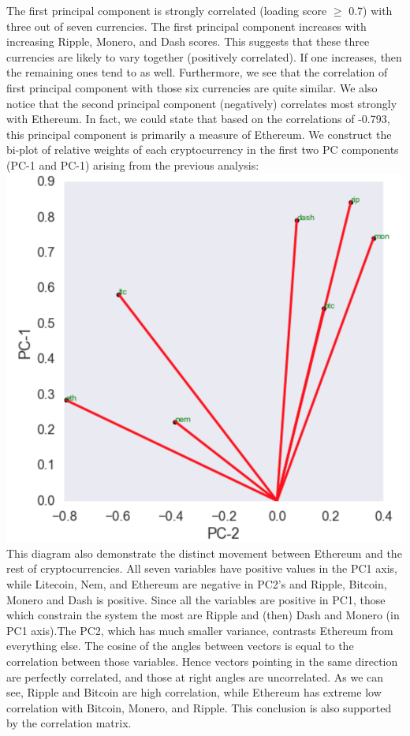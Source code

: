 \documentclass[12pt,twoside]{article}
\begin{document}
\bigbreak
The first principal component is strongly correlated (loading score $\geq$ 0.7) with three out of seven currencies. The first principal component increases with increasing Ripple, Monero, and Dash scores. This suggests that these three currencies are likely to vary together (positively correlated). If one increases, then the remaining ones tend to as well. Furthermore, we see that the correlation of first principal component with those six currencies are quite similar. \newline
We also notice that the second principal component (negatively) correlates most strongly with Ethereum. In fact, we could state that based on the correlations of -0.793, this principal component is primarily a measure of Ethereum.
\bigbreak
We construct the bi-plot of relative weights of each cryptocurrency in the first two PC components (PC-1 and PC-1) arising from the previous analysis:
\bigbreak
\includegraphics[scale=.6]{biplot1.png}
\bigbreak
This diagram also demonstrate the distinct movement between Ethereum and the rest of cryptocurrencies. All seven variables have positive values in the PC1 axis, while Litecoin, Nem, and Ethereum are negative in PC2's and Ripple, Bitcoin, Monero and Dash is positive. Since all the variables are positive in PC1, those which constrain the system the most are Ripple and (then) Dash and Monero (in PC1 axis).The PC2, which has much smaller variance, contrasts Ethereum from everything else.
\bigbreak
The cosine of the angles between vectors is equal to the correlation between those variables. Hence vectors pointing in the same direction are perfectly correlated, and those at right angles are uncorrelated. As we can see, Ripple and Bitcoin are high correlation, while Ethereum has extreme low correlation with Bitcoin, Monero, and Ripple. This conclusion is also supported by the correlation matrix.
\end{document}

